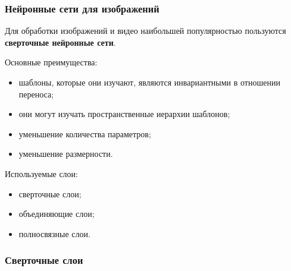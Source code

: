 \documentclass[unicode,9pt, pdf]{beamer}
\begin{document}
\begin{frame}
    \frametitle{Нейронные сети для изображений}

Для обработки изображений и видео наибольшей популярностью пользуются \textbf{сверточные нейронные сети}.

    \vspace{0.5cm}
	Основные преимущества:
        \begin{itemize}
            \item шаблоны, которые они изучают, являются инвариантными в отношении переноса;
            \item они могут изучать пространственные иерархии шаблонов;
            \item уменьшение количества параметров;
            \item уменьшение размерности.
        
        \end{itemize}
  
    \vspace{0.5cm}
	Используемые слои:
        \begin{itemize}
            \item сверточные слои;
            \item объединяющие слои;
            \item полносвязные слои.
        
        \end{itemize}  
        
        
\end{frame}
    
\begin{frame}
\frametitle{Сверточные слои}
	\begin{figure}[h!]
		
	
	
	\end{figure}
\end{frame}
\end{document}
